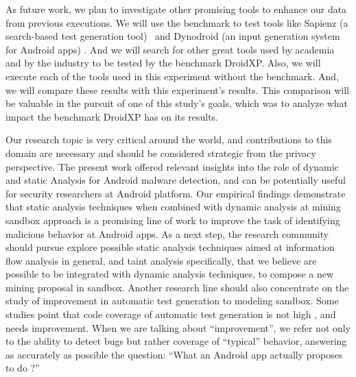 As future work, we plan to investigate other promising tools to enhance our data from previous executions. We will use the benchmark to test tools like Sapienz (a search-based test generation tool)~\cite{DBLP:conf/issta/MaoHJ16} and Dynodroid (an input generation system for Android apps) \cite{DBLP:conf/sigsoft/MachiryTN13}. And we will search for other great tools used by academia and by the industry to be tested by the benchmark DroidXP.
Also, we will execute each of the tools used in this experiment without the benchmark. And, we will compare these results with this experiment's results. This comparison will be valuable in the pursuit of one of this study's goals, which was to analyze what impact the benchmark DroidXP has on its results.

Our research topic is very critical around the world, and contributions to this domain are necessary and should be considered strategic from the privacy perspective. The present work offered relevant insights into the role of dynamic and static Analysis for Android malware detection, and can be potentially useful for security researchers at Android platform. Our empirical findings demonstrate that static analysis techniques when combined with dynamic analysis at mining sandbox approach is a promising line of work
to improve the task of identifying malicious behavior at Android apps. As a next step, the research community should pursue explore possible static analysis techniques aimed at information flow analysis \cite{DBLP:conf/kbse/ShenVTADLKZ14} in general, and taint analysis \cite{arzt:pldi-2014} specifically, that we believe are possible to be integrated with dynamic analysis techniques, to compose a new mining proposal in sandbox. Another research line should also concentrate on the study of improvement in automatic test generation to modeling sandbox. Some studies point that code coverage of automatic test generation is not high \cite{DBLP:conf/sigsoft/ZengLZXDLYX16}\cite{DBLP:conf/kbse/ChoudharyGO15}, and needs improvement. When we are talking about ``improvement'', we refer not only to the ability to detect bugs but rather coverage of ``typical'' behavior, answering as accurately as possible the question: ``What an Android app actually proposes to do ?''
